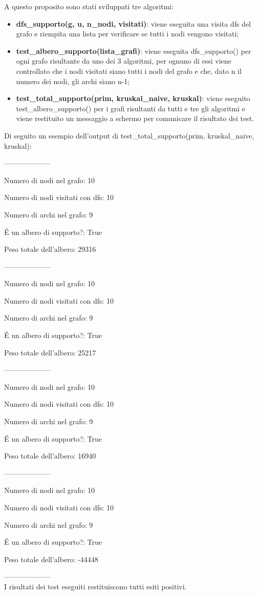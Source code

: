 A questo proposito sono stati sviluppati tre algoritmi:

\begin{itemize}
    \item \textbf{dfs\_supporto(g, u, n\_nodi, visitati)}: viene eseguita una visita dfs del grafo e riempita una lista per verificare se tutti i nodi vengono visitati;
    
    \item \textbf{test\_albero\_supporto(lista\_grafi)}: viene eseguita dfs\_supporto() per ogni grafo risultante da uno dei 3 algoritmi, per ognuno di essi viene controllato che i nodi visitati siano tutti i nodi del grafo e che, dato n il numero dei nodi, gli archi siano n-1;
    
    \item \textbf{test\_total\_supporto(prim, kruskal\_naive, kruskal)}: viene eseguito test\_albero\_supporto() per i grafi risultanti da tutti e tre gli algoritmi e viene restituito un messaggio a schermo per comunicare il risultato dei test.
    
    
\end{itemize}

\newpage

Di seguito un esempio dell'output di test\_total\_supporto(prim, kruskal\_naive, kruskal):

--------------------

Numero di nodi nel grafo:  10 

Numero di nodi visitati con dfs:  10

Numero di archi nel grafo:  9

É un albero di supporto?:  True

Peso totale dell'albero:  29316

--------------------

Numero di nodi nel grafo:  10

Numero di nodi visitati con dfs:  10

Numero di archi nel grafo:  9

É un albero di supporto?:  True

Peso totale dell'albero:  25217

--------------------

Numero di nodi nel grafo:  10

Numero di nodi visitati con dfs:  10

Numero di archi nel grafo:  9

É un albero di supporto?:  True

Peso totale dell'albero:  16940

--------------------

Numero di nodi nel grafo:  10

Numero di nodi visitati con dfs:  10

Numero di archi nel grafo:  9

É un albero di supporto?:  True

Peso totale dell'albero:  -44448

--------------------
\newline \\
I risultati dei test eseguiti restituiscono tutti esiti positivi.

    

